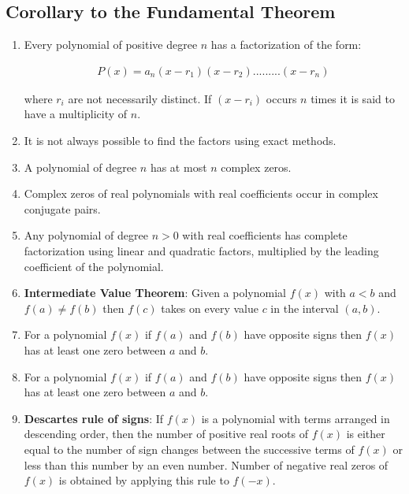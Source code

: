 \subsection{Corollary to the Fundamental Theorem}
\begin{enumerate}
\item Every polynomial of positive degree $n$ has a factorization of the form:

\begin{tcolorbox}
\begin{align}
P(x) = a_n (x-r_1)(x-r_2).........(x-r_n)
\end{align}
\end{tcolorbox}

where $r_i$ are not necessarily distinct. If $(x-r_i)$ occurs $n$ times it is said to have a multiplicity of $n$.

\item It is not always possible to find the factors using exact methods.

\item A polynomial of degree $n$ has at most $n$ complex zeros.

\item Complex zeros of real polynomials with real coefficients occur in complex conjugate pairs.

\item Any polynomial of degree $n>0$ with real coefficients has complete factorization using linear and quadratic factors, multiplied by the leading coefficient of the polynomial.

\item \textbf{Intermediate Value Theorem}: Given a polynomial $f(x)$ with $a<b$ and $f(a) \neq f(b)$ then $f(c)$ takes on every value $c$ in the interval $(a,b)$.

\item For a polynomial $f(x)$ if $f(a)$ and $f(b)$ have opposite signs then $f(x)$ has at least one zero between $a$ and $b$.

\item For a polynomial $f(x)$ if $f(a)$ and $f(b)$ have opposite signs then $f(x)$ has at least one zero between $a$ and $b$.

\item \textbf{Descartes rule of signs}: If $f(x)$ is a polynomial with terms arranged in descending order, then the number of positive real roots of $f(x)$ is either equal to the number of sign changes between the successive terms of $f(x)$ or less than this number by an even number. Number of negative real zeros of $f(x)$ is obtained by applying this rule to $f(-x)$.

\end{enumerate}


